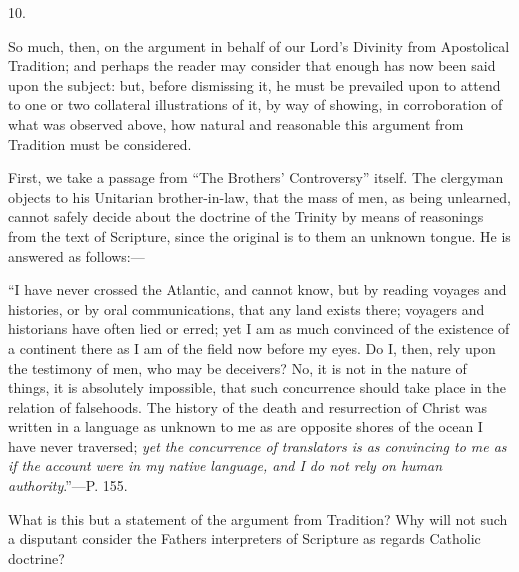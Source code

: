 10.

So much, then, on the argument in behalf of our
Lord's Divinity from Apostolical Tradition; and perhaps the reader may
consider that enough has now been said upon the subject: but, before
dismissing it, he must be prevailed upon to attend to one or two
collateral illustrations of it, by way of showing, in corroboration of
what was observed above, how natural and reasonable this argument from
Tradition must be considered.

First, we take a passage from ``The Brothers'
Controversy'' itself. The clergyman objects to his Unitarian
brother-in-law, that the mass of men, as being unlearned, cannot
safely decide about the doctrine of the Trinity by means of reasonings
from the text of Scripture, since the original is to them an unknown
tongue. He is answered as follows:—

``I have never crossed the
Atlantic, and cannot know, but by reading voyages and histories, or by
oral communications, that any land exists there; voyagers and
historians have often lied or erred; yet I am as much convinced of the
existence of a continent there as I am of the field now before my
eyes. Do I, then, rely upon the testimony of men, who may be
deceivers? No, it is not in the nature of things, it is absolutely
impossible, that such concurrence should take place in the relation of
falsehoods. The history of the death and resurrection of Christ was
written in a language as unknown to me as are opposite shores of the
ocean I have never traversed; \emph{yet the concurrence of translators is
as convincing to me as if the account were in my native language, and
I do not rely on human authority}.''—P. 155.

What is this but a statement of the argument from
Tradition? Why will not such a disputant consider the Fathers
interpreters of Scripture as regards Catholic doctrine?

